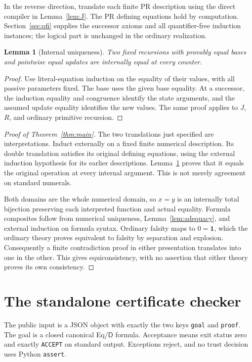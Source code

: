 \documentclass[11pt,letterpaper]{article}
\newtheorem{lemma}[theorem]{Lemma}
\theoremstyle{definition}\newtheorem{definition}[theorem]{Definition}
\theoremstyle{remark}\newtheorem{remark}[theorem]{Remark}
\newcommand{\DD}{\mathsf D}
\newcommand{\one}{\mathbf1}
\begin{document}
In the reverse direction, translate each finite PR description
using the direct compiler in Lemma~\ref{lem:J}. The PR defining
equations hold by computation. Section~\ref{sec:qfi} supplies
the successor axioms and all quantifier-free induction instances;
the logical part is unchanged in the ordinary realization.

\begin{lemma}[Internal uniqueness]\label{lem:uniqueness}
Two fixed recursions with provably equal bases and pointwise
equal updates are internally equal at every counter.
\end{lemma}
\begin{proof}
Use literal-equation induction on the equality of their values,
with all passive parameters fixed. The base uses the given
base equality. At a successor, the induction equality and
congruence identify the state arguments, and the assumed
update equality identifies the new values. The same proof
applies to $J$, $R$, and ordinary primitive recursion.
\end{proof}

\begin{proof}[Proof of Theorem~\ref{thm:main}]
The two translations just specified are interpretations.
Induct externally on a fixed finite numerical description.
Its double translation satisfies its original defining
equations, using the external induction hypothesis for its
earlier descriptions. Lemma~\ref{lem:uniqueness} proves that
it equals the original operation at every internal argument.
This is not merely agreement on standard numerals.

Both domains are the whole numerical domain, so $x=y$ is an
internally total bijection preserving each interpreted function
and actual equality. Formula composites follow from numerical
uniqueness, Lemma~\ref{lem:adequacy}, and external induction on
formula syntax. Ordinary falsity maps to $0=\one$, which the
ordinary theory proves equivalent to falsity by separation
and explosion. Consequently a finite contradiction proof in
either presentation translates into one in the other. This
gives equiconsistency, with no assertion that either theory
proves its own consistency.
\end{proof}

\section{The standalone certificate checker}\label{sec:checker}

The public input is a JSON object with exactly the two keys
\texttt{goal} and \texttt{proof}. The goal is a closed canonical
Eq/$\DD$ formula. Acceptance means exit status zero and exactly
\texttt{ACCEPT} on standard output. Exceptions reject, and no
trust decision uses Python \texttt{assert}.
\end{document}
